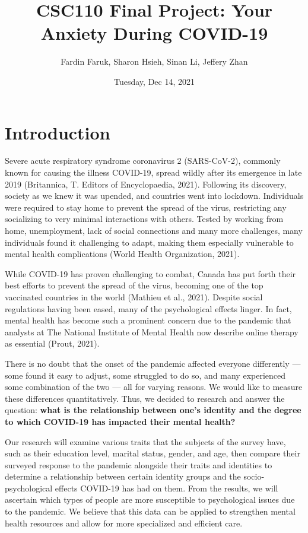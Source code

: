 \documentclass[fontsize=11pt]{article}
\title{CSC110 Final Project: Your Anxiety During COVID-19}
\author{Fardin Faruk, Sharon Hsieh, Sinan Li, Jeffery Zhan}
\date{Tuesday, Dec 14, 2021}
\begin{document}
    \maketitle

    \section*{Introduction}
    Severe acute respiratory syndrome coronavirus 2 (SARS-CoV-2), commonly known for causing the illness COVID-19, spread wildly after its emergence in late 2019 (Britannica, T. Editors of Encyclopaedia, 2021).
    Following its discovery, society as we knew it was upended, and countries went into lockdown.
    Individuals were required to stay home to prevent the spread of the virus, restricting any socializing to very minimal interactions with others.
    Tested by working from home, unemployment, lack of social connections and many more challenges, many individuals found it challenging to adapt, making them especially vulnerable to mental health complications (World Health Organization, 2021).

    While COVID-19 has proven challenging to combat, Canada has put forth their best efforts to prevent the spread of the virus, becoming one of the top vaccinated countries in the world (Mathieu et al., 2021).
    Despite social regulations having been eased, many of the psychological effects linger.
    In fact, mental health has become such a prominent concern due to the pandemic that analysts at The National Institute of Mental Health now describe online therapy as essential (Prout, 2021).

    There is no doubt that the onset of the pandemic affected everyone differently — some found it easy to adjust, some struggled to do so, and many experienced some combination of the two — all for varying reasons.
    We would like to measure these differences quantitatively.
    Thus, we decided to research and answer the question: \textbf{what is the relationship between one’s identity and the degree to which COVID-19 has impacted their mental health?}

    Our research will examine various traits that the subjects of the survey have, such as their education level, marital status, gender, and age, then compare their surveyed response to the pandemic alongside their traits and identities to determine a relationship between certain identity groups and the socio-psychological effects COVID-19 has had on them.
    From the results, we will ascertain which types of people are more susceptible to psychological issues due to the pandemic.
    We believe that this data can be applied to strengthen mental health resources and allow for more specialized and efficient care.
\end{document}
